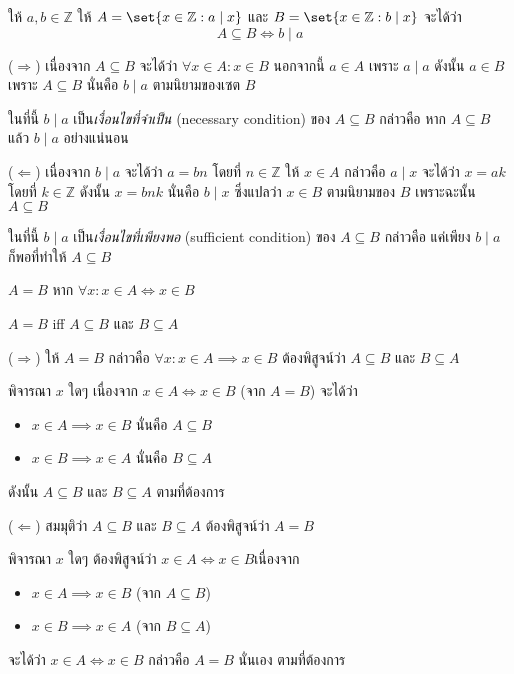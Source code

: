 \begin{theorem}
ให้ $a,b\in\mathbb{Z}$ \enskip ให้ $A=\set{x\in\mathbb{Z}:a\mid x}$ และ $B=\set{x\in\mathbb{Z}:b\mid x}$ จะได้ว่า \[A\subseteq B\iff b\mid a\]
\begin{pf}
($\Rightarrow$) เนื่องจาก $A\subseteq B$ จะได้ว่า $\forall x\in A: x\in B$ \enskip นอกจากนี้ $a\in A$ เพราะ $a\mid a$ \enskip ดังนั้น $a\in B$ เพราะ $A\subseteq B$ \enskip นั่นคือ $b\mid a$ ตามนิยามของเซต $B$

ในที่นี้ $b\mid a$ เป็น\emph{เงื่อนไขที่จำเป็น} (necessary condition) ของ $A\subseteq B$ กล่าวคือ หาก $A\subseteq B$ แล้ว $b\mid a$ อย่างแน่นอน

($\Leftarrow$) เนื่องจาก $b\mid a$ จะได้ว่า $a=bn$ โดยที่ $n\in\mathbb{Z}$ \enskip ให้ $x\in A$ กล่าวคือ $a\mid x$ จะได้ว่า $x=ak$ โดยที่ $k\in\mathbb{Z}$ \enskip ดังนั้น $x=bnk$ นั่นคือ $b\mid x$ ซึ่งแปลว่า $x\in B$ ตามนิยามของ $B$ \enskip เพราะฉะนั้น $A\subseteq B$

ในที่นี้ $b\mid a$ เป็น\emph{เงื่อนไขที่เพียงพอ} (sufficient condition) ของ $A\subseteq B$ กล่าวคือ แค่เพียง $b\mid a$ ก็พอที่ทำให้ $A\subseteq B$
\end{pf}
\end{theorem}

\begin{definition}
$A=B$ หาก $\forall x: x\in A\iff x\in B$
\end{definition}
%
\begin{theorem}
$A=B$ iff $A\subseteq B$ และ $B\subseteq A$
\begin{pf}
($\Rightarrow$) ให้ $A=B$ กล่าวคือ $\forall x: x\in A\implies x\in B$ ต้องพิสูจน์ว่า $A\subseteq B$ และ $B\subseteq A$

พิจารณา $x$ ใดๆ \enskip เนื่องจาก $x\in A\iff x\in B$ (จาก $A=B$) จะได้ว่า
\begin{itemize}
\item $x\in A\implies x\in B$ นั่นคือ $A\subseteq B$
\item $x\in B\implies x\in A$ นั่นคือ $B\subseteq A$
\end{itemize}
ดังนั้น $A\subseteq B$ และ $B\subseteq A$ ตามที่ต้องการ

($\Leftarrow$) สมมุติว่า $A\subseteq B$ และ $B\subseteq A$ ต้องพิสูจน์ว่า $A=B$

พิจารณา $x$ ใดๆ ต้องพิสูจน์ว่า $x\in A\iff x\in B$\enskip เนื่องจาก
\begin{itemize}
\item $x\in A\implies x\in B$ (จาก $A\subseteq B$)
\item $x\in B\implies x\in A$ (จาก $B\subseteq A$)
\end{itemize}
จะได้ว่า $x\in A\iff x\in B$ กล่าวคือ $A=B$ นั่นเอง ตามที่ต้องการ
\end{pf}
\end{theorem}


